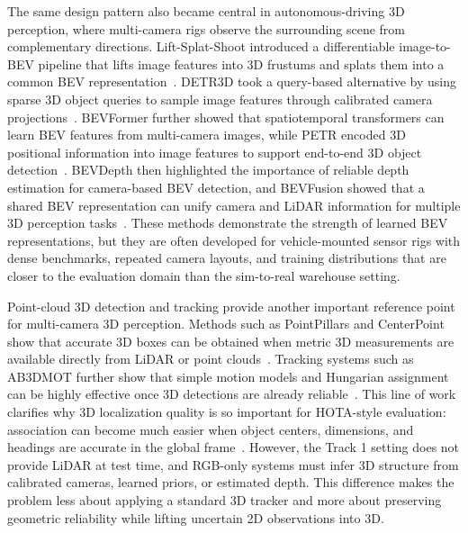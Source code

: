 \documentclass[runningheads]{llncs}
\begin{document}
The same design pattern also became central in autonomous-driving 3D perception,
where multi-camera rigs observe the surrounding scene from complementary
directions. Lift-Splat-Shoot introduced a differentiable image-to-BEV pipeline
that lifts image features into 3D frustums and splats them into a common BEV
representation~\cite{philion2020lift}. DETR3D took a query-based alternative by
using sparse 3D object queries to sample image features through calibrated
camera projections~\cite{wang2022detr3d}. BEVFormer further showed that
spatiotemporal transformers can learn BEV features from multi-camera images,
while PETR encoded 3D positional information into image features to support
end-to-end 3D object detection~\cite{li2022bevformer,liu2022petr}. BEVDepth
then highlighted the importance of reliable depth estimation for camera-based
BEV detection, and BEVFusion showed that a shared BEV representation can unify
camera and LiDAR information for multiple 3D perception tasks~\cite{li2023bevdepth,
liu2023bevfusion}. These methods demonstrate the strength of learned BEV
representations, but they are often developed for vehicle-mounted sensor rigs
with dense benchmarks, repeated camera layouts, and training distributions that
are closer to the evaluation domain than the sim-to-real warehouse setting.

Point-cloud 3D detection and tracking provide another important reference point
for multi-camera 3D perception. Methods such as PointPillars and CenterPoint
show that accurate 3D boxes can be obtained when metric 3D measurements are
available directly from LiDAR or point clouds~\cite{lang2019pointpillars,
yin2021centerpoint}. Tracking systems such as AB3DMOT further show that simple
motion models and Hungarian assignment can be highly effective once 3D detections
are already reliable~\cite{weng2020ab3dmot}. This line of work clarifies why 3D
localization quality is so important for HOTA-style evaluation: association can
become much easier when object centers, dimensions, and headings are accurate in
the global frame~\cite{luiten2021hota}. However, the Track 1 setting does not
provide LiDAR at test time, and RGB-only systems must infer 3D structure from
calibrated cameras, learned priors, or estimated depth. This difference makes
the problem less about applying a standard 3D tracker and more about preserving
geometric reliability while lifting uncertain 2D observations into 3D.
\end{document}
